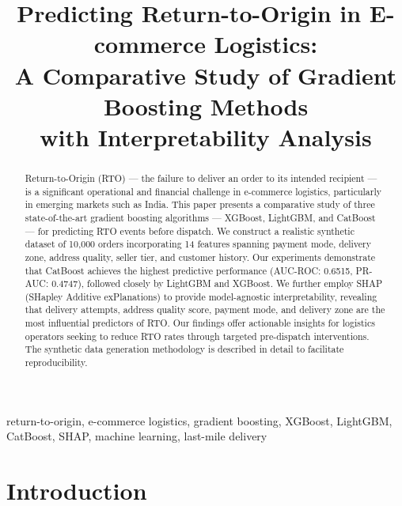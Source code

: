 \documentclass[conference]{IEEEtran}
\begin{document}
\title{Predicting Return-to-Origin in E-commerce Logistics:\\
A Comparative Study of Gradient Boosting Methods\\
with Interpretability Analysis}

\author{
}

\maketitle

\begin{abstract}
Return-to-Origin (RTO) — the failure to deliver an order to its intended recipient — is a significant operational and financial challenge in e-commerce logistics, particularly in emerging markets such as India. This paper presents a comparative study of three state-of-the-art gradient boosting algorithms — XGBoost, LightGBM, and CatBoost — for predicting RTO events before dispatch. We construct a realistic synthetic dataset of 10,000 orders incorporating 14 features spanning payment mode, delivery zone, address quality, seller tier, and customer history. Our experiments demonstrate that CatBoost achieves the highest predictive performance (AUC-ROC: 0.6515, PR-AUC: 0.4747), followed closely by LightGBM and XGBoost. We further employ SHAP (SHapley Additive exPlanations) to provide model-agnostic interpretability, revealing that delivery attempts, address quality score, payment mode, and delivery zone are the most influential predictors of RTO. Our findings offer actionable insights for logistics operators seeking to reduce RTO rates through targeted pre-dispatch interventions. The synthetic data generation methodology is described in detail to facilitate reproducibility.
\end{abstract}

\begin{IEEEkeywords}
return-to-origin, e-commerce logistics, gradient boosting, XGBoost, LightGBM, CatBoost, SHAP, machine learning, last-mile delivery
\end{IEEEkeywords}

\section{Introduction}
\end{document}
